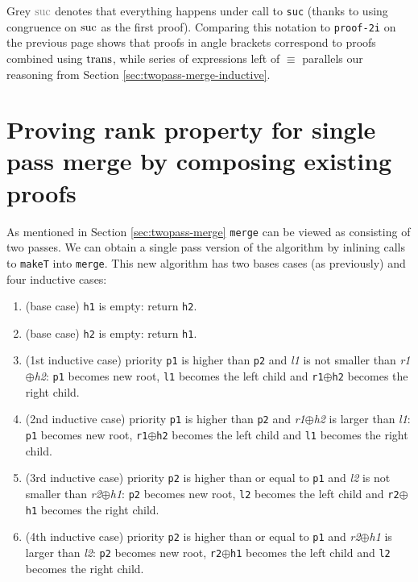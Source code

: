 \noindent
Grey ${\color{gray}\suc}$ denotes that everything happens under call to \texttt{suc} (thanks to using congruence on $\operatorname{suc}$ as the first proof). Comparing this notation to \texttt{proof-2i} on the previous page shows that proofs in angle brackets correspond to proofs combined using $\operatorname{trans}$, while series of expressions left of $≡$ parallels our reasoning from Section \ref{sec:twopass-merge-inductive}.

\section[Proving rank property for single pass merge by composing existing proofs]{Proving rank property for single pass merge by composing existing proofs} \label{sec:single-pass-merge-proof-by-comp}

As mentioned in Section \ref{sec:twopass-merge} \texttt{merge} can be viewed as consisting of two passes. We can obtain a single pass version of the algorithm by inlining calls to \texttt{makeT} into \texttt{merge}. This new algorithm has two bases cases (as previously) and four inductive cases:

\begin{enumerate}
 \item (base case) \texttt{h1} is empty: return \texttt{h2}.
 \item (base case) \texttt{h2} is empty: return \texttt{h1}.
 \item (1st inductive case) priority \texttt{p1} is higher than \texttt{p2} and \textit{l1} is not smaller than  \textit{r1}$\oplus$\textit{h2}: \texttt{p1} becomes new root, \texttt{l1} becomes the left child and \texttt{r1}$\oplus$\texttt{h2} becomes the right child.
 \item (2nd inductive case) priority \texttt{p1} is higher than \texttt{p2} and \textit{r1}$\oplus$\textit{h2} is larger than \textit{l1}: \texttt{p1} becomes new root, \texttt{r1}$\oplus$\texttt{h2} becomes the left child and \texttt{l1} becomes the right child.
 \item (3rd inductive case) priority \texttt{p2} is higher than or equal to \texttt{p1} and \textit{l2} is not smaller than  \textit{r2}$\oplus$\textit{h1}: \texttt{p2} becomes new root, \texttt{l2} becomes the left child and \texttt{r2}$\oplus$\texttt{h1} becomes the right child.
 \item (4th inductive case) priority \texttt{p2} is higher than or equal to \texttt{p1} and \textit{r2}$\oplus$\textit{h1} is larger than  \textit{l2}: \texttt{p2} becomes new root, \texttt{r2}$\oplus$\texttt{h1} becomes the left child and \texttt{l2} becomes the right child.
\end{enumerate}

